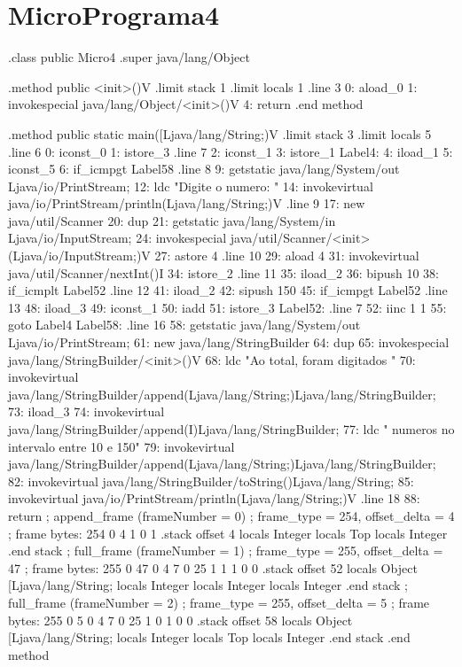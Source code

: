 \documentclass[12pt,a4paper,twoside]{report}
\begin{document}
\section{MicroPrograma4}
\begin{terminal}
.class public Micro4
.super java/lang/Object

.method public <init>()V
  .limit stack 1
  .limit locals 1
  .line 3
  0: aload_0
  1: invokespecial java/lang/Object/<init>()V
  4: return
.end method

.method public static main([Ljava/lang/String;)V
  .limit stack 3
  .limit locals 5
  .line 6
  0: iconst_0
  1: istore_3
  .line 7
  2: iconst_1
  3: istore_1
Label4:
  4: iload_1
  5: iconst_5
  6: if_icmpgt Label58
  .line 8
  9: getstatic java/lang/System/out Ljava/io/PrintStream;
  12: ldc "Digite o numero: "
  14: invokevirtual java/io/PrintStream/println(Ljava/lang/String;)V
  .line 9
  17: new java/util/Scanner
  20: dup
  21: getstatic java/lang/System/in Ljava/io/InputStream;
  24: invokespecial java/util/Scanner/<init>(Ljava/io/InputStream;)V
  27: astore 4
  .line 10
  29: aload 4
  31: invokevirtual java/util/Scanner/nextInt()I
  34: istore_2
  .line 11
  35: iload_2
  36: bipush 10
  38: if_icmplt Label52
  .line 12
  41: iload_2
  42: sipush 150
  45: if_icmpgt Label52
  .line 13
  48: iload_3
  49: iconst_1
  50: iadd
  51: istore_3
Label52:
  .line 7
  52: iinc 1 1
  55: goto Label4
Label58:
  .line 16
  58: getstatic java/lang/System/out Ljava/io/PrintStream;
  61: new java/lang/StringBuilder
  64: dup
  65: invokespecial java/lang/StringBuilder/<init>()V
  68: ldc "Ao total, foram digitados "
  70: invokevirtual java/lang/StringBuilder/append(Ljava/lang/String;)Ljava/lang/StringBuilder;
  73: iload_3
  74: invokevirtual java/lang/StringBuilder/append(I)Ljava/lang/StringBuilder;
  77: ldc " numeros no intervalo entre 10 e 150"
  79: invokevirtual java/lang/StringBuilder/append(Ljava/lang/String;)Ljava/lang/StringBuilder;
  82: invokevirtual java/lang/StringBuilder/toString()Ljava/lang/String;
  85: invokevirtual java/io/PrintStream/println(Ljava/lang/String;)V
  .line 18
  88: return
  ; append_frame (frameNumber = 0)
  ; frame_type = 254, offset_delta = 4
  ; frame bytes: 254 0 4 1 0 1
  .stack
    offset 4
    locals Integer
    locals Top
    locals Integer
    .end stack
  ; full_frame (frameNumber = 1)
  ; frame_type = 255, offset_delta = 47
  ; frame bytes: 255 0 47 0 4 7 0 25 1 1 1 0 0
  .stack
    offset 52
    locals Object [Ljava/lang/String;
    locals Integer
    locals Integer
    locals Integer
    .end stack
  ; full_frame (frameNumber = 2)
  ; frame_type = 255, offset_delta = 5
  ; frame bytes: 255 0 5 0 4 7 0 25 1 0 1 0 0
  .stack
    offset 58
    locals Object [Ljava/lang/String;
    locals Integer
    locals Top
    locals Integer
    .end stack
.end method

\end{terminal}
\end{document}
